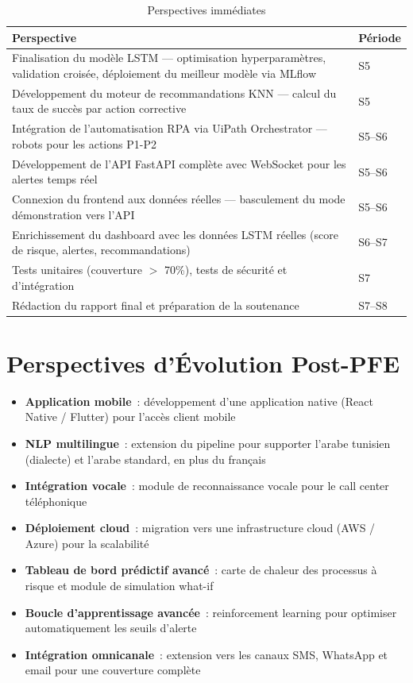 \documentclass[12pt,a4paper]{report}
\begin{document}
\begin{table}[H]
\centering
\caption{Perspectives immédiates}
\begin{tabularx}{\textwidth}{|X|l|}
\hline
\textbf{Perspective} & \textbf{Période} \\
\hline
Finalisation du modèle LSTM --- optimisation hyperparamètres, validation croisée, déploiement du meilleur modèle via MLflow & S5 \\
\hline
Développement du moteur de recommandations KNN --- calcul du taux de succès par action corrective & S5 \\
\hline
Intégration de l'automatisation RPA via UiPath Orchestrator --- robots pour les actions P1-P2 & S5--S6 \\
\hline
Développement de l'API FastAPI complète avec WebSocket pour les alertes temps réel & S5--S6 \\
\hline
Connexion du frontend aux données réelles --- basculement du mode démonstration vers l'API & S5--S6 \\
\hline
Enrichissement du dashboard avec les données LSTM réelles (score de risque, alertes, recommandations) & S6--S7 \\
\hline
Tests unitaires (couverture $>$ 70\%), tests de sécurité et d'intégration & S7 \\
\hline
Rédaction du rapport final et préparation de la soutenance & S7--S8 \\
\hline
\end{tabularx}
\end{table}

\section{Perspectives d'Évolution Post-PFE}

\begin{itemize}[noitemsep]
    \item \textbf{Application mobile}~: développement d'une application native (React Native / Flutter) pour l'accès client mobile
    \item \textbf{NLP multilingue}~: extension du pipeline pour supporter l'arabe tunisien (dialecte) et l'arabe standard, en plus du français
    \item \textbf{Intégration vocale}~: module de reconnaissance vocale pour le call center téléphonique
    \item \textbf{Déploiement cloud}~: migration vers une infrastructure cloud (AWS / Azure) pour la scalabilité
    \item \textbf{Tableau de bord prédictif avancé}~: carte de chaleur des processus à risque et module de simulation what-if
    \item \textbf{Boucle d'apprentissage avancée}~: reinforcement learning pour optimiser automatiquement les seuils d'alerte
    \item \textbf{Intégration omnicanale}~: extension vers les canaux SMS, WhatsApp et email pour une couverture complète
\end{itemize}
\end{document}
